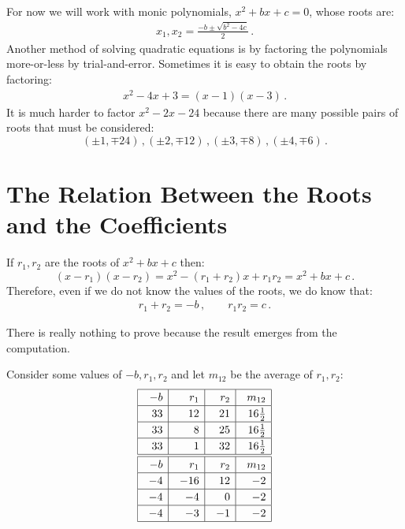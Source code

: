 \newpage

For now we will work with monic polynomials, $x^2+bx+c=0$, whose roots are:
\begin{align}
x_1, x_2 = \frac{-b\pm\sqrt{b^2-4c}}{2}\,.\label{eq.quadratic-roots}
\end{align}
Another method of solving quadratic equations is by factoring the polynomials more-or-less by trial-and-error. Sometimes it is easy to obtain the roots by factoring:
\begin{align}
x^2-4x+3= (x-1)(x-3)\label{eq.quadratic-lill}\,.
\end{align}
It is much harder to factor $x^2-2x-24$ because there are many possible pairs of roots that must be considered:
\[
(\pm 1,\mp 24)\,, (\pm 2,\mp 12)\,, (\pm 3,\mp 8)\,, (\pm 4,\mp 6)\,.
\]

\section{The Relation Between the Roots and the Coefficients}\label{s.computing}
\begin{theorem}\label{thm.roots-coefficients}
If $r_1,r_2$ are the roots of $x^2+bx+c$ then:
\[
(x-r_1)(x-r_2)=x^2 - (r_1+r_2)x + r_1r_2=x^2+bx+c\,.
\]
Therefore, even if we do not know the values of the roots, we do know that:
\begin{align}\label{eq.viete-quad}
r_1+r_2 = -b\,,\quad\quad r_1r_2=c\,.
\end{align}
\end{theorem}

There is really nothing to prove because the result emerges from the computation.

Consider some values of $-b,r_1,r_2$ and let $m_{12}$ be the average of $r_1,r_2$:
\[
\renewcommand{\arraystretch}{1.2}
\begin{array}{|@{\hspace{1em}}r|@{\hspace{1em}}r|@{\hspace{1em}}r|@{\hspace{1em}}r|}
\hline
-b& r_1 & r_2 &m_{12}\\\hline
33 & 12 & 21 & 16\frac{1}{2}\\\hline
33 & 8 & 25 & 16\frac{1}{2}\\\hline
33 & 1 & 32 & 16\frac{1}{2}\\\hline\hline
-b& r_1 & r_2 &m_{12}\\\hline
-4 & -16 & 12 & -2 \\\hline
-4 & -4 & 0 & -2 \\\hline
-4 & -3 & -1 & -2 \\\hline
\end{array}
\]

